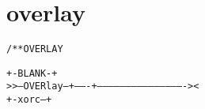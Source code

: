 \section{overlay}
\begin{shaded}
\begin{alltt}
/** OVERLAY

              +-BLANK-+
 >>--OVERlay--+-------+---------------------------------------------->< 
              +-xorc--+

\end{alltt}
\end{shaded}
